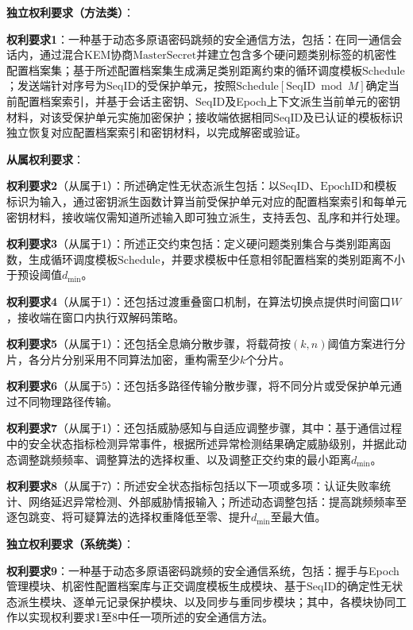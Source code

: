 ﻿\documentclass[12pt,a4paper]{article}
\begin{document}
\textbf{独立权利要求（方法类）}：

\textbf{权利要求1}：一种基于动态多原语密码跳频的安全通信方法，包括：在同一通信会话内，通过混合KEM协商$\text{MasterSecret}$并建立包含多个硬问题类别标签的机密性配置档案集；基于所述配置档案集生成满足类别距离约束的循环调度模板$\text{Schedule}$；发送端针对序号为$\text{SeqID}$的受保护单元，按照$\text{Schedule}[\text{SeqID} \bmod M]$确定当前配置档案索引，并基于会话主密钥、$\text{SeqID}$及Epoch上下文派生当前单元的密钥材料，对该受保护单元实施加密保护；接收端依据相同$\text{SeqID}$及已认证的模板标识独立恢复对应配置档案索引和密钥材料，以完成解密或验证。

\textbf{从属权利要求}：

\textbf{权利要求2}（从属于1）：所述确定性无状态派生包括：以$\text{SeqID}$、$\text{EpochID}$和模板标识为输入，通过密钥派生函数计算当前受保护单元对应的配置档案索引和每单元密钥材料，接收端仅需知道所述输入即可独立派生，支持丢包、乱序和并行处理。

\textbf{权利要求3}（从属于1）：所述正交约束包括：定义硬问题类别集合与类别距离函数，生成循环调度模板$\text{Schedule}$，并要求模板中任意相邻配置档案的类别距离不小于预设阈值$d_{\min}$。

\textbf{权利要求4}（从属于1）：还包括过渡重叠窗口机制，在算法切换点提供时间窗口$W$，接收端在窗口内执行双解码策略。

\textbf{权利要求5}（从属于1）：还包括全息熵分散步骤，将载荷按$(k,n)$阈值方案进行分片，各分片分别采用不同算法加密，重构需至少$k$个分片。

\textbf{权利要求6}（从属于5）：还包括多路径传输分散步骤，将不同分片或受保护单元通过不同物理路径传输。

\textbf{权利要求7}（从属于1）：还包括威胁感知与自适应调整步骤，其中：基于通信过程中的安全状态指标检测异常事件，根据所述异常检测结果确定威胁级别，并据此动态调整跳频频率、调整算法的选择权重、以及调整正交约束的最小距离$d_{\min}$。

\textbf{权利要求8}（从属于7）：所述安全状态指标包括以下一项或多项：认证失败率统计、网络延迟异常检测、外部威胁情报输入；所述动态调整包括：提高跳频频率至逐包跳变、将可疑算法的选择权重降低至零、提升$d_{\min}$至最大值。

\textbf{独立权利要求（系统类）}：

\textbf{权利要求9}：一种基于动态多原语密码跳频的安全通信系统，包括：握手与Epoch管理模块、机密性配置档案库与正交调度模板生成模块、基于$\text{SeqID}$的确定性无状态派生模块、逐单元记录保护模块、以及同步与重同步模块；其中，各模块协同工作以实现权利要求1至8中任一项所述的安全通信方法。
\end{document}
